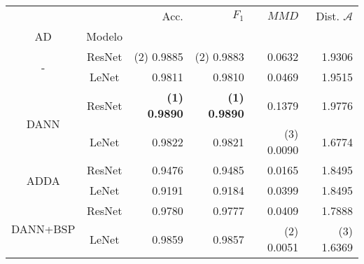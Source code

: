 \begin{table}[H]
    \centering
    \begin{tabular}{cc|rrrr}
        \toprule
                                     &        & Acc.                                & $F_1$                               & $MMD$                               & Dist. $\mathcal{A}$                 \\
        AD                           & Modelo &                                     &                                     &                                     &                                     \\
        \midrule
        \multirow[c]{2}{*}{-}        & ResNet & {\footnotesize (2)} 0.9885          & {\footnotesize (2)} 0.9883          & 0.0632                              & 1.9306                              \\
                                     & LeNet  & 0.9811                              & 0.9810                              & 0.0469                              & 1.9515                              \\\hline
        \multirow[c]{2}{*}{DANN}     & ResNet & \textbf{{\footnotesize (1)} 0.9890} & \textbf{{\footnotesize (1)} 0.9890} & 0.1379                              & 1.9776                              \\
                                     & LeNet  & 0.9822                              & 0.9821                              & {\footnotesize (3)} 0.0090          & 1.6774                              \\\hline
        \multirow[c]{2}{*}{ADDA}     & ResNet & 0.9476                              & 0.9485                              & 0.0165                              & 1.8495                              \\
                                     & LeNet  & 0.9191                              & 0.9184                              & 0.0399                              & 1.8495                              \\\hline
        \multirow[c]{2}{*}{DANN+BSP} & ResNet & 0.9780                              & 0.9777                              & 0.0409                              & 1.7888                              \\
                                     & LeNet  & 0.9859                              & 0.9857                              & {\footnotesize (2)} 0.0051          & {\footnotesize (3)} 1.6369          \\\hline

\end{tabular}
\end{table}
